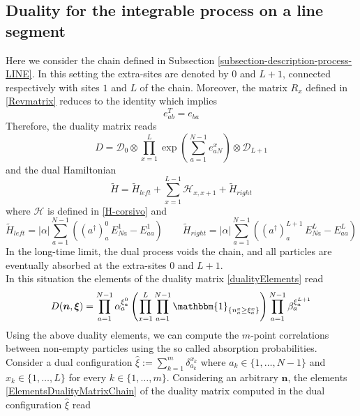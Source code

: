 \documentclass[10pt]{article}
\numberwithin{equation}{section}
\numberwithin{equation}{subsection}
\begin{document}
\subsection{Duality for the integrable process on a line segment}
Here we consider the chain defined in Subsection \ref{subsection-description-process-LINE}. In this setting the extra-sites are denoted by $0$ and $L+1$, connected respectively with sites $1$ and $L$ of the chain. Moreover, the matrix $R_{x}$ defined in \eqref{Revmatrix} 
reduces to the identity which implies 
\begin{equation}\label{transpostionPropertyFund}
	e_{ab}^T= e_{ba}
\end{equation}
Therefore, the duality matrix reads
\begin{equation}
	D=\mathcal{D}_{0}\otimes\prod_{x=1}^{L}\exp{\left(\sum_{a=1}^{N-1}e_{aN}^{x}\right)}\otimes \mathcal{D}_{L+1}
\end{equation}
and the dual Hamiltonian 
\begin{equation}
	\widetilde{H}=\widetilde{H}_{left}+\sum_{x=1}^{L-1}\mathcal{H}_{x,x+1}+\widetilde{H}_{right}
\end{equation}
where $\mathcal{H}$ is defined in \eqref{H-corsivo} and 
\begin{equation}
	\widetilde{H}_{left}=|\alpha|\sum_{a=1}^{N-1}\left((a^{\dagger})_{a}^{0}\,E_{Na}^{1}-E_{aa}^{1}\right)\qquad 	\widetilde{H}_{right}=|\alpha|\sum_{a=1}^{N-1}\left((a^{\dagger})_{a}^{L+1}\,E_{Na}^{L}-E_{aa}^{L}\right)
\end{equation}
In the long-time limit, the dual process voids the chain, and all particles are eventually absorbed at the extra-sites $0$ and $L+1$.\\
In this situation the elements of the duality matrix \eqref{dualityElements} read
\begin{equation}\label{ElementsDualityMatrixChain}
	D(\bm{n},\bm{\xi})=\prod_{a=1}^{N-1}\alpha_{a}^{\xi_{a}^{0}}\left(\prod_{x=1}^{L}\prod_{a=1}^{N-1}\mathbbm{1}_{\{n_{a}^{x}\geq \xi_{a}^{x}\}}\right)\prod_{a=1}^{N-1}\beta_{a}^{\xi_{a}^{L+1}}
\end{equation}
Using the above duality elements, we can compute the  $m$-point correlations between non-empty particles using the so called absorption probabilities. Consider a dual configuration $\hat{\xi}:=\sum_{k=1}^{m}\delta_{a_{k}}^{x_{k}}$ where $a_{k}\in\{1,\ldots,N-1\}$ and $x_{k}\in\{1,\ldots,L\}$ for every $k\in\{1,\ldots,m\}$. Considering an arbitrary $\bm{n}$, the elements \eqref{ElementsDualityMatrixChain} of the duality matrix computed in the dual configuration $\hat{\xi}$ read
\end{document}
